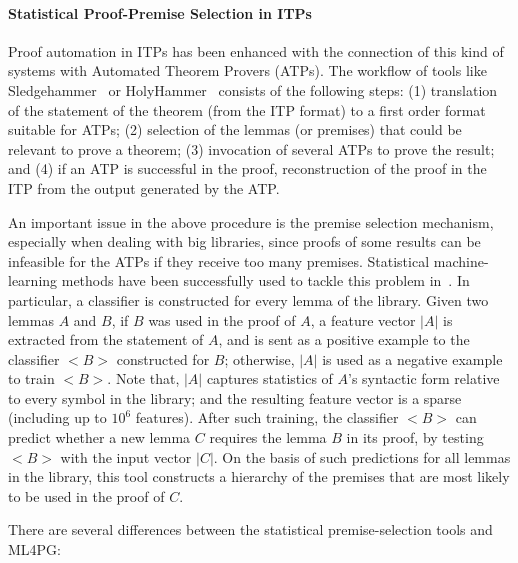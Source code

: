 \paragraph{Statistical Proof-Premise Selection in ITPs} Proof automation in ITPs has been enhanced with the connection of this kind of 
systems with Automated Theorem Provers (ATPs). The workflow of tools like Sledgehammer~\cite{Paulson_threeyears} or HolyHammer~\cite{holyhammer} consists of the following steps: (1) translation of the statement of the theorem (from the ITP format) to a
first order format suitable for ATPs; (2) selection of the lemmas (or premises) that could be relevant to prove a theorem; 
(3) invocation of several ATPs to prove the result; and (4) if an ATP is successful in the proof, reconstruction of the proof in
the ITP from the output generated by the ATP.

An important issue in the above procedure is the premise selection mechanism, especially when dealing with big libraries, since proofs of some results can be infeasible for the ATPs if they receive too many premises. Statistical machine-learning methods have been 
successfully used to tackle this problem in~\cite{UrbanSPV08,K13,holyhammer}. In particular, a classifier is constructed for every 
lemma of the library. Given two lemmas $A$ and $B$, if $B$ was used in the proof of $A$, a feature vector $|A|$  is extracted 
from the statement of $A$, and is sent as a positive example to the classifier $<B>$ constructed for $B$; otherwise, $|A|$ is
used as a negative example to train $<B>$.
Note that, $|A|$  captures statistics of $A$'s syntactic form relative to
every symbol in the library; and the resulting feature vector is a sparse (including up to $10^6$ features).
 After such training, the classifier $<B>$ can predict whether a new lemma $C$ requires 
the lemma $B$ in its proof, by testing $<B>$ with the input vector $|C|$. On the basis of such predictions for all lemmas in the library,  this tool constructs a hierarchy of the premises that are most likely to be used in the proof
of $C$. 

There are several differences between the statistical premise-selection tools and ML4PG:

